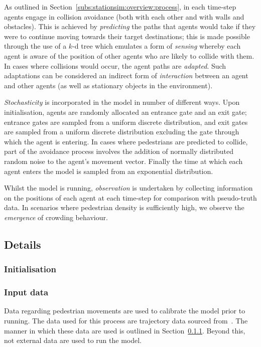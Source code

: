 As outlined in Section~\ref{subs:stationsim:overview:process}, in each time-step
agents engage in collision avoidance (both with each other and with walls and
obstacles).
This is achieved by \emph{predicting} the paths that agents would take if they
were to continue moving towards their target destinations; this is made possible
through the use of a $k$-d tree which emulates a form of \emph{sensing} whereby
each agent is aware of the position of other agents who are likely to collide
with them.
In cases where collisions would occur, the agent paths are \emph{adapted}.
Such adaptations can be considered an indirect form of \emph{interaction}
between an agent and other agents (as well as stationary objects in the
environment).

\emph{Stochasticity} is incorporated in the model in number of different ways.
Upon initialisation, agents are randomly allocated an entrance gate and an exit
gate; entrance gates are sampled from a uniform discrete distribution, and exit
gates are sampled from a uniform discrete distribution excluding the gate
through which the agent is entering.
In cases where pedestrians are predicted to collide, part of the avoidance
process involves the addition of normally distributed random noise to the
agent's movement vector.
Finally the time at which each agent enters the model is sampled from an
exponential distribution.

Whilst the model is running, \emph{observation} is undertaken by collecting
information on the positions of each agent at each time-step for comparison with
pseudo-truth data.
In scenarios where pedestrian density is sufficiently high, we observe the
\emph{emergence} of crowding behaviour.

\subsection{Details}\label{sub:stationsim:details}

\subsubsection{Initialisation}\label{subs:stationsim:details:initialisation}

\subsubsection{Input data}\label{subs:stationsim:details:input}

Data regarding pedestrian movements are used to calibrate the model prior to
running.
The data used for this process are trajectory data sourced
from~\cite{zhou2012understanding}.
The manner in which these data are used is outlined in
Section~\ref{subs:stationsim:details:initialisation}.
Beyond this, not external data are used to run the model.

